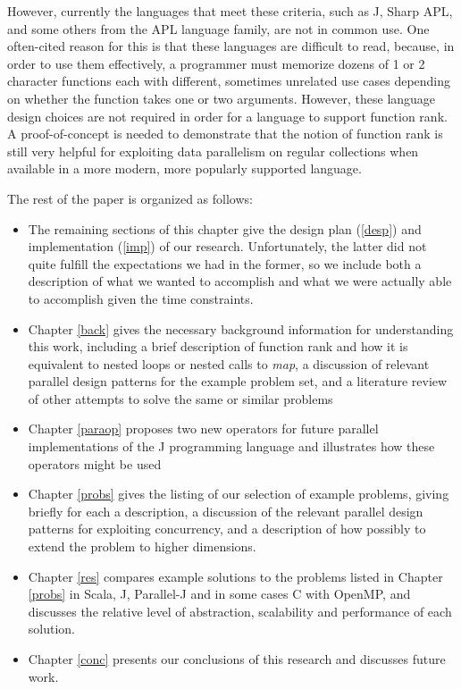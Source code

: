 However, currently the languages that meet these criteria, 
such as J, Sharp APL, and some others from the APL language family, 
are not in common use. %
One often-cited reason for this is that these languages are difficult to read, %
because, in order to use them effectively, a programmer must memorize 
dozens of 1 or 2 character functions each with different, sometimes unrelated use cases 
depending on whether the function takes one or two arguments.\cite{jvocab} %
However, these language design choices are not required in order for a language to support function rank.
A proof-of-concept is needed %
to demonstrate that the notion of function rank %
is still very helpful for exploiting data parallelism on regular collections 
when available in a more modern, more popularly supported language.

The rest of the paper is organized as follows:
\begin{itemize} 
	\item The remaining sections of this chapter give the design plan (\ref{desp}) and implementation (\ref{imp}) of our research. 
	Unfortunately, the latter did not quite fulfill the expectations we had in the former, so we include both a description of what we wanted to accomplish and what we were actually able to accomplish given the time constraints. 
	\item Chapter \ref{back} gives the necessary background information for understanding this work, 
	including a brief description of function rank and how it is equivalent to nested loops or nested calls to \textit{map},
	a discussion of relevant parallel design patterns for the example problem set, 
	and a literature review of other attempts to solve the same or similar problems
	\item Chapter \ref{paraop} proposes two new operators for future parallel implementations of the J programming language 
		and illustrates how these operators might be used
    \item Chapter \ref{probs} gives the listing of our selection of example problems, giving briefly for each a description, a discussion of the relevant parallel design patterns for exploiting concurrency, and a description of how possibly to extend the problem to higher dimensions.
    \item Chapter \ref{res} compares example solutions to the problems listed in Chapter \ref{probs} in Scala, J, Parallel-J and in some cases C with OpenMP, and discusses the relative level of abstraction, scalability and performance of each solution. %
    \item Chapter \ref{conc} presents our conclusions of this research and discusses future work. 
\end{itemize}

